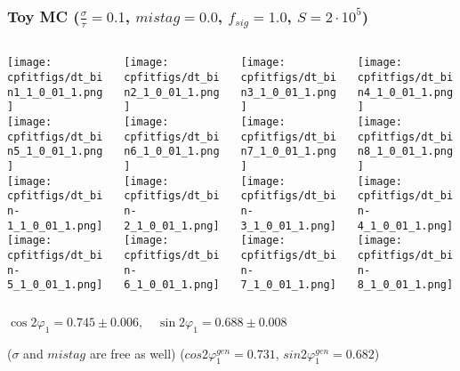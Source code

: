 \documentclass[10 pt,compress,mathserif]{beamer}
\begin{document}
\begin{frame}
 \frametitle{Toy MC ($\frac{\sigma}{\tau}=0.1$, $mistag = 0.0$, $f_{sig} = 1.0$, $S = 2\cdot10^5$)}
 \begin{columns}
  \begin{column}{0.25\textwidth}
   \texttt{[image: cpfitfigs/dt\_bin1\_1\_0\_01\_1.png]}\\
   \texttt{[image: cpfitfigs/dt\_bin5\_1\_0\_01\_1.png]}\\
   \texttt{[image: cpfitfigs/dt\_bin-1\_1\_0\_01\_1.png]}\\
   \texttt{[image: cpfitfigs/dt\_bin-5\_1\_0\_01\_1.png]}
  \end{column}
  \begin{column}{0.25\textwidth}
   \texttt{[image: cpfitfigs/dt\_bin2\_1\_0\_01\_1.png]}\\
   \texttt{[image: cpfitfigs/dt\_bin6\_1\_0\_01\_1.png]}\\
   \texttt{[image: cpfitfigs/dt\_bin-2\_1\_0\_01\_1.png]}\\
   \texttt{[image: cpfitfigs/dt\_bin-6\_1\_0\_01\_1.png]}
  \end{column}
  \begin{column}{0.25\textwidth}
   \texttt{[image: cpfitfigs/dt\_bin3\_1\_0\_01\_1.png]}\\
   \texttt{[image: cpfitfigs/dt\_bin7\_1\_0\_01\_1.png]}\\
   \texttt{[image: cpfitfigs/dt\_bin-3\_1\_0\_01\_1.png]}\\
   \texttt{[image: cpfitfigs/dt\_bin-7\_1\_0\_01\_1.png]}
  \end{column}
  \begin{column}{0.25\textwidth}
   \texttt{[image: cpfitfigs/dt\_bin4\_1\_0\_01\_1.png]}\\
   \texttt{[image: cpfitfigs/dt\_bin8\_1\_0\_01\_1.png]}\\
   \texttt{[image: cpfitfigs/dt\_bin-4\_1\_0\_01\_1.png]}\\
   \texttt{[image: cpfitfigs/dt\_bin-8\_1\_0\_01\_1.png]}
  \end{column}
 \end{columns}
 \begin{center}
  $\cos{2\varphi_1} = 0.745 \pm 0.006,\quad \sin{2\varphi_1} = 0.688 \pm 0.008$
  
  ($\sigma$ and $mistag$ are free as well) ($cos2\varphi^{gen}_1 = 0.731$, $sin2\varphi^{gen}_1 = 0.682$)
 \end{center}
\end{frame}
\end{document}
